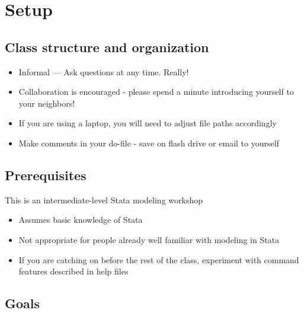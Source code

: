 \documentclass[
]{book}
\providecommand{\tightlist}{%
  \setlength{\itemsep}{0pt}\setlength{\parskip}{0pt}}
\begin{document}
\hypertarget{setup-8}{%
\section{Setup}\label{setup-8}}

\hypertarget{class-structure-and-organization-2}{%
\subsection{Class structure and organization}\label{class-structure-and-organization-2}}

\begin{itemize}
\tightlist
\item
  Informal --- Ask questions at any time. Really!
\item
  Collaboration is encouraged - please spend a minute introducing yourself to your neighbors!
\item
  If you are using a laptop, you will need to adjust file paths accordingly
\item
  Make comments in your do-file - save on flash drive or email to yourself
\end{itemize}

\hypertarget{prerequisites-8}{%
\subsection{Prerequisites}\label{prerequisites-8}}

This is an intermediate-level Stata modeling workshop

\begin{itemize}
\tightlist
\item
  Assumes basic knowledge of Stata
\item
  Not appropriate for people already well familiar with modeling in Stata
\item
  If you are catching on before the rest of the class, experiment with command features described in help files
\end{itemize}

\hypertarget{goals-7}{%
\subsection{Goals}\label{goals-7}}
\end{document}
